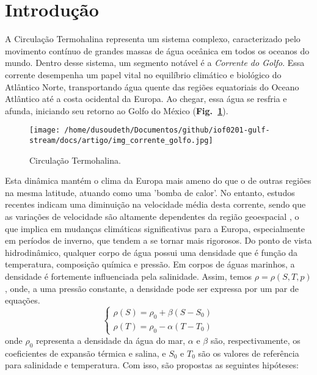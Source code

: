 \documentclass[journal]{IEEEtran}
\newcommand{\figref}[1]{(\textbf{Fig.~\ref{#1}})}
\begin{document}
    \section{Introdução}
        A Circulação Termohalina representa um sistema complexo, caracterizado pelo movimento contínuo de grandes massas de água oceânica em todos os oceanos do mundo. Dentro desse sistema, um segmento notável é a \textit{Corrente do Golfo}. Essa corrente desempenha um papel vital no equilíbrio climático e biológico do Atlântico Norte, transportando água quente das regiões equatoriais do Oceano Atlântico até a costa ocidental da Europa. Ao chegar, essa água se resfria e afunda, iniciando seu retorno ao Golfo do México \figref{fig:img_corrente_golfo}.
        \begin{figure}[ht]
            \centering
            \texttt{[image: /home/dusoudeth/Documentos/github/iof0201-gulf-stream/docs/artigo/img\_corrente\_golfo.jpg]}
            \caption{Circulação Termohalina.}
            \label{fig:img_corrente_golfo}
        \end{figure}
        Esta dinâmica mantém o clima da Europa mais ameno do que o de outras regiões na mesma latitude, atuando como uma 'bomba de calor'. No entanto, estudos recentes indicam uma diminuição na velocidade média desta corrente, sendo que as variações de velocidade são altamente dependentes da região geoespacial \cite{Dong2019}, o que implica em mudanças climáticas significativas para a Europa, especialmente em períodos de inverno, que tendem a se tornar mais rigorosos. \newline
        Do ponto de vista hidrodinâmico, qualquer corpo de água possui uma densidade que é função da temperatura, composição química e pressão. Em corpos de águas marinhos, a densidade é fortemente influenciada pela salinidade. Assim, temos \(\rho = \rho(S, T, p)\), onde, a uma pressão constante, a densidade pode ser expressa por um par de equações.
        \begin{equation}
            \left\{\begin{matrix}
                \rho(S) = \rho_0 + \beta (S - S_0) \\
                \rho(T) = \rho_0 - \alpha (T - T_0)
            \end{matrix}\right.
        \end{equation}
        onde \(\rho_0\) representa a densidade da água do mar, \(\alpha\) e \(\beta\) são, respectivamente, os coeficientes de expansão térmica e salina, e \(S_0\) e \(T_0\) são os valores de referência para salinidade e temperatura. Com isso, são propostas as seguintes hipóteses:
\end{document}
